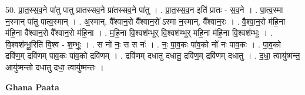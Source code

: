 \documentclass[17pt]{extarticle}
\begin{document}
50. प्रा॒त॒स्स॒व॒ने पा॑तु पातु प्रातस्सव॒ने प्रा॑तस्सव॒ने पा॑तु । . प्रा॒त॒स्स॒व॒न इति॑ प्रातः - स॒व॒ने । . पा॒त्व॒स्मा न॒स्मान् पा॑तु पात्व॒स्मान् । . अ॒स्मान्. वै᳚श्वान॒रो वै᳚श्वान॒रो᳚ ऽस्मा न॒स्मान्. वै᳚श्वान॒रः । . वै॒श्वा॒न॒रो म॑हि॒ना म॑हि॒ना वै᳚श्वान॒रो वै᳚श्वान॒रो म॑हि॒ना । . म॒हि॒ना वि॒श्वश॑म्भूर् वि॒श्वश॑म्भूर् महि॒ना म॑हि॒ना वि॒श्वश॑म्भूः । . वि॒श्वश॑म्भू॒रिति॑ वि॒श्व - श॒म्भूः॒ । . स नो॑ नः॒ स स नः॑ । . नः॒ पा॒व॒कः पा॑व॒को नो॑ नः पाव॒कः । . पा॒व॒को द्रवि॑ण॒म् द्रवि॑णम् पाव॒कः पा॑व॒को द्रवि॑णम् । . द्रवि॑णम् दधातु दधातु॒ द्रवि॑ण॒म् द्रवि॑णम् दधातु । . द॒धा॒ त्वायु॑ष्मन्त॒ आयु॑ष्मन्तो दधातु दधा॒ त्वायु॑ष्मन्तः । \newline

\textbf{Ghana Paata } \newline
\end{document}

